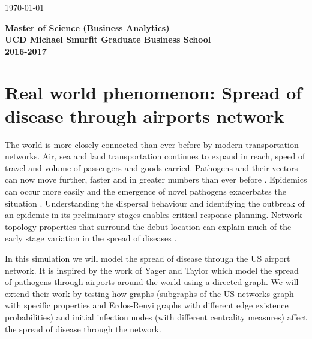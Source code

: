 \documentclass[a4paper,11pt]{article}
\begin{document}
\begin{titlepage}
{\large \today}\\[3cm] %


 

{

	 \vspace{1.5in}\textmd{\textbf{Master of Science (Business Analytics)}}\\
     \large{\textbf{UCD Michael Smurfit Graduate Business School }}\\
      \textmd{\textbf{2016-2017}}\\
 }     
\vfill %

\end{titlepage}






\section{Real world phenomenon: Spread of disease through airports network} 


The world is more closely connected than ever before by modern transportation networks. Air, sea and land transportation continues to expand in reach, speed of travel and volume of passengers and goods carried. Pathogens and their vectors can now move further, faster and in greater numbers than ever before \cite{tatem2006global}. Epidemics can occur more easily and the emergence of novel pathogens exacerbates the situation \cite{jones2008global}. Understanding the dispersal behaviour and identifying the outbreak of an epidemic in its preliminary stages enables critical response planning. Network topology properties that surround the debut location can explain much of the early stage variation in the spread of diseases \cite{lawyer2016measuring}.

In this simulation we will model the spread of disease through the US airport network. It is inspired by the work of Yager and Taylor \cite{nicholasyager2014} which model the spread of pathogens through airports around the world using a directed graph. We will extend their work by testing how graphs (subgraphs of the US networks graph with specific properties and Erdos-Renyi graphs with different edge existence probabilities) and initial infection nodes (with different centrality measures) affect the spread of disease through the network.
\end{document}
